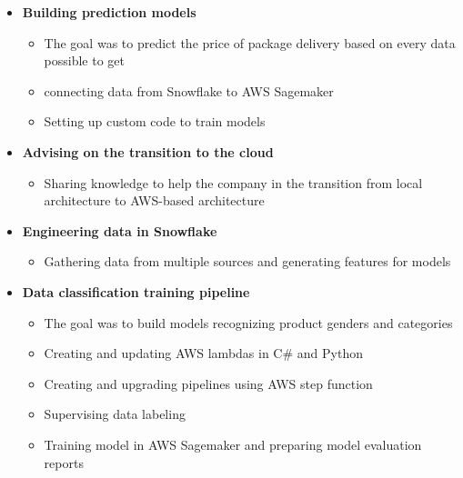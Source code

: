 \documentclass[10pt,a4paper,ragged2e,withhyper, normalphoto]{altacv}
\begin{document}
\begin{paracol}{2}


    \begin{itemize}
    
    \item  \textbf{\textcolor{DarkPastelRed}{Building prediction models}}
        \begin{itemize}
            \item The goal was to predict the price of package delivery based on every data possible to get
            \item connecting data from Snowflake to AWS Sagemaker
            \item Setting up custom code to train models
        \end{itemize}
    \item \textbf{\textcolor{DarkPastelRed}{Advising on the transition to the cloud}}
        \begin{itemize}
            \item Sharing knowledge to help the company in the transition from local architecture to AWS-based architecture
        \end{itemize}
    \item  \textbf{\textcolor{DarkPastelRed}{Engineering data in Snowflake}}
        \begin{itemize}
            \item Gathering data from multiple sources and generating features for models
        \end{itemize}
    
    \end{itemize}
    
    \divider

    
    \begin{itemize}
        \item \textbf{\textcolor{DarkPastelRed}{Data classification training pipeline}}
        \begin{itemize}
            \item The goal was to build models recognizing product genders and categories
            \item Creating and updating AWS lambdas in C\# and Python
            \item Creating and upgrading pipelines using AWS step function
            \item Supervising data labeling
            \item Training model in AWS Sagemaker and preparing model evaluation reports
        \end{itemize}


\end{itemize}
\end{paracol}
\end{document}
